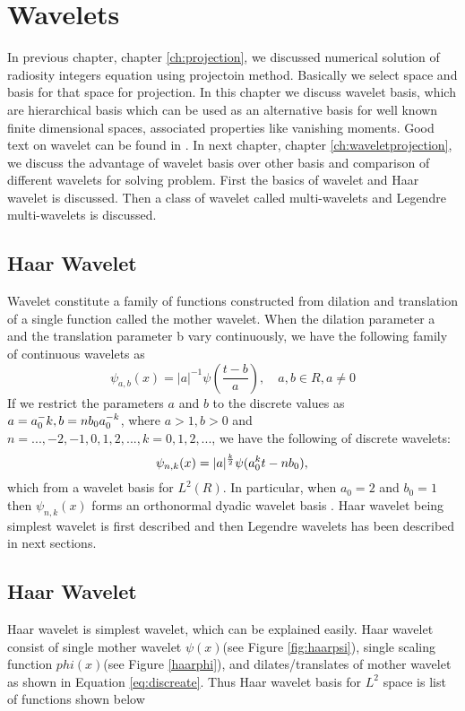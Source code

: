 \chapter{\label{ch:wavelets}Wavelets}
In previous chapter, chapter \ref{ch:projection}, we discussed numerical solution of radiosity integers equation using projectoin method. Basically we select space and basis for that space for projection. In this chapter we discuss wavelet basis, which are hierarchical basis which can be used as an alternative basis for well known finite dimensional spaces, associated properties like vanishing moments. Good text on wavelet can be found in \cite{book:goswami} \cite{book:Stollnitz}. In next chapter, chapter \ref{ch:waveletprojection}, we discuss the advantage of wavelet basis over other basis and comparison of different wavelets for solving problem. First the basics of wavelet and Haar wavelet is discussed. Then a class of wavelet called multi-wavelets and Legendre multi-wavelets is discussed.
\section{Haar Wavelet}
Wavelet constitute a family of functions constructed from dilation and translation of a single function called the mother wavelet. When the dilation parameter a and the translation parameter b vary continuously, we have the following family of continuous wavelets as \cite{book:boggess}\\
\begin{equation}
\psi_{a,b}(x) = {|a|}^{-1} \psi(\frac {t-b}{a}),\quad a,b \in R, a \neq 0
\end{equation}
If we restrict the parameters $a$ and $b$ to the discrete values as $a = a_0 ^-k, \\b = n b_0 a_0^{-k}$, where $a>1,b>0$ and $n =..., -2, -1, 0, 1, 2,...,k=0,1,2,...$, we have the following of discrete wavelets:\\
\begin{equation}\label{eq:discreate}
\psi_{n,k}(x) = |a|^\frac{k}{2} \psi(a_0^k t - nb_0) ,\\
\end{equation}
 which from a wavelet basis for $L^2(R)$. In particular, when $a_0 = 2$ and $b_0 = 1$ then $\psi_{n,k} (x)$ forms an orthonormal dyadic wavelet basis \cite{book:goswami}. Haar wavelet being simplest wavelet is first described and  then Legendre wavelets has been described in next sections.


\section{Haar Wavelet}
Haar wavelet is simplest wavelet, which can be explained easily. Haar wavelet consist of single mother wavelet $\psi(x)$(see Figure \ref{fig:haarpsi}), single scaling function $phi(x)$(see Figure \ref{haarphi}), and dilates/translates of mother wavelet as shown in Equation \ref{eq:discreate}.  Thus Haar wavelet basis for $L^2$ space is list of functions shown below

